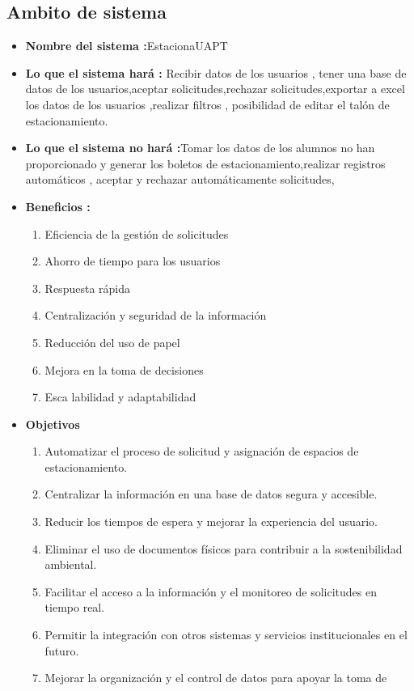 {\subsection{Ambito de sistema }
\begin{itemize}
\item{\textbf{Nombre del sistema  :}EstacionaUAPT}
\item {\textbf{Lo que el sistema hará :} Recibir datos de los usuarios , tener una base
	de datos de los usuarios,aceptar solicitudes,rechazar solicitudes,exportar
	a excel los datos de los usuarios ,realizar filtros , posibilidad de editar el
	talón de estacionamiento.}
\item {\textbf{Lo que el sistema no hará :}Tomar los datos de los alumnos no han
	proporcionado y generar los boletos de estacionamiento,realizar registros
	automáticos , aceptar y rechazar automáticamente solicitudes,}
	\item{\textbf{Beneficios :}
	\begin{enumerate}
\item Eficiencia de la gestión de solicitudes
\item Ahorro de tiempo para los usuarios
\item Respuesta rápida
\item Centralización y seguridad de la información
\item Reducción del uso de papel
\item Mejora en la toma de decisiones
\item Esca labilidad y adaptabilidad
		\end{enumerate}}
\item {\textbf{Objetivos} 
\begin{enumerate}
\item  Automatizar el proceso de solicitud y asignación de espacios de estacionamiento.
\item Centralizar la información en una base de datos segura y accesible.
\item Reducir los tiempos de espera y mejorar la experiencia del usuario.
\item Eliminar el uso de documentos físicos para contribuir a la sostenibilidad ambiental.
\item Facilitar el acceso a la información y el monitoreo de solicitudes en
tiempo real.
\item Permitir la integración con otros sistemas y servicios institucionales
en el futuro.
\item Mejorar la organización y el control de datos para apoyar la toma de

\end{enumerate}}
\end{itemize}}
